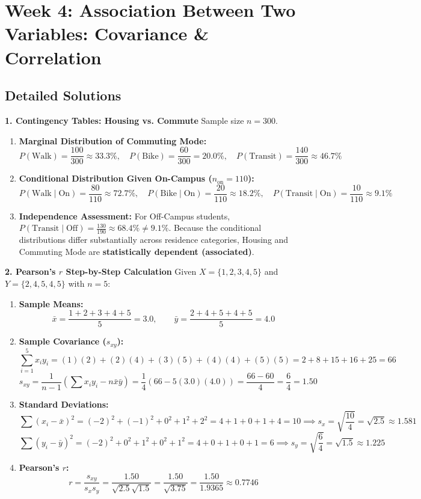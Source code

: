 \section*{Week 4: Association Between Two Variables: Covariance \& Correlation}

\subsection*{Detailed Solutions}

\textbf{1. Contingency Tables: Housing vs. Commute}
Sample size $n = 300$.
\begin{enumerate}
    \item \textbf{Marginal Distribution of Commuting Mode:}
    $$P(\text{Walk}) = \frac{100}{300} \approx \mathbf{33.3\%}, \quad P(\text{Bike}) = \frac{60}{300} = \mathbf{20.0\%}, \quad P(\text{Transit}) = \frac{140}{300} \approx \mathbf{46.7\%}$$
    \item \textbf{Conditional Distribution Given On-Campus ($n_{\text{on}} = 110$):}
    $$P(\text{Walk} \mid \text{On}) = \frac{80}{110} \approx \mathbf{72.7\%}, \quad P(\text{Bike} \mid \text{On}) = \frac{20}{110} \approx \mathbf{18.2\%}, \quad P(\text{Transit} \mid \text{On}) = \frac{10}{110} \approx \mathbf{9.1\%}$$
    \item \textbf{Independence Assessment:} For Off-Campus students, $P(\text{Transit} \mid \text{Off}) = \frac{130}{190} \approx 68.4\% \neq 9.1\%$. Because the conditional distributions differ substantially across residence categories, Housing and Commuting Mode are \textbf{statistically dependent (associated)}.
\end{enumerate}

\textbf{2. Pearson's $r$ Step-by-Step Calculation}
Given $X = \{1, 2, 3, 4, 5\}$ and $Y = \{2, 4, 5, 4, 5\}$ with $n = 5$:
\begin{enumerate}
    \item \textbf{Sample Means:}
    $$\bar{x} = \frac{1 + 2 + 3 + 4 + 5}{5} = \mathbf{3.0}, \qquad \bar{y} = \frac{2 + 4 + 5 + 4 + 5}{5} = \mathbf{4.0}$$
    \item \textbf{Sample Covariance ($s_{xy}$):}
    $$\sum_{i=1}^5 x_i y_i = (1)(2) + (2)(4) + (3)(5) + (4)(4) + (5)(5) = 2 + 8 + 15 + 16 + 25 = 66$$
    $$s_{xy} = \frac{1}{n-1}\left(\sum x_i y_i - n\bar{x}\bar{y}\right) = \frac{1}{4}(66 - 5(3.0)(4.0)) = \frac{66 - 60}{4} = \frac{6}{4} = \mathbf{1.50}$$
    \item \textbf{Standard Deviations:}
    $$\sum (x_i - \bar{x})^2 = (-2)^2 + (-1)^2 + 0^2 + 1^2 + 2^2 = 4 + 1 + 0 + 1 + 4 = 10 \implies s_x = \sqrt{\frac{10}{4}} = \sqrt{2.5} \approx 1.581$$
    $$\sum (y_i - \bar{y})^2 = (-2)^2 + 0^2 + 1^2 + 0^2 + 1^2 = 4 + 0 + 1 + 0 + 1 = 6 \implies s_y = \sqrt{\frac{6}{4}} = \sqrt{1.5} \approx 1.225$$
    \item \textbf{Pearson's $r$:}
    $$r = \frac{s_{xy}}{s_x s_y} = \frac{1.50}{\sqrt{2.5}\sqrt{1.5}} = \frac{1.50}{\sqrt{3.75}} = \frac{1.50}{1.9365} \approx \mathbf{0.7746}$$
\end{enumerate}

